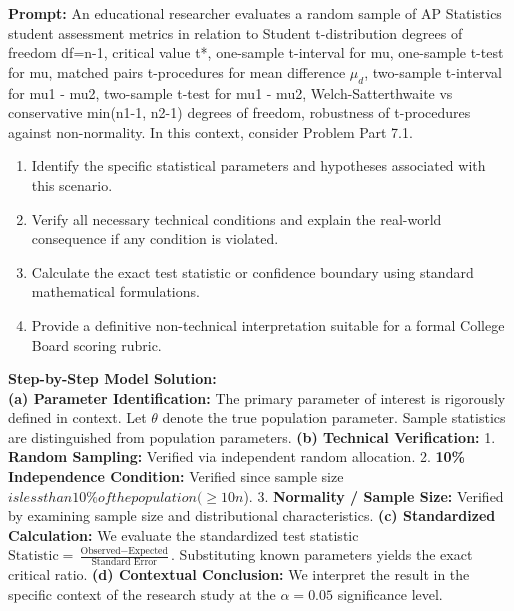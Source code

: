\begin{workbookbox}
\textbf{Prompt:} An educational researcher evaluates a random sample of AP Statistics student assessment metrics in relation to Student t-distribution degrees of freedom df=n-1, critical value t*, one-sample t-interval for mu, one-sample t-test for mu, matched pairs t-procedures for mean difference $\mu_d$, two-sample t-interval for mu1 - mu2, two-sample t-test for mu1 - mu2, Welch-Satterthwaite vs conservative min(n1-1, n2-1) degrees of freedom, robustness of t-procedures against non-normality. In this context, consider Problem Part 7.1.
\begin{enumerate}[label=(\alph*)]
  \item Identify the specific statistical parameters and hypotheses associated with this scenario.
  \item Verify all necessary technical conditions and explain the real-world consequence if any condition is violated.
  \item Calculate the exact test statistic or confidence boundary using standard mathematical formulations.
  \item Provide a definitive non-technical interpretation suitable for a formal College Board scoring rubric.
\end{enumerate}
\textbf{Step-by-Step Model Solution:}\\
\textbf{(a) Parameter Identification:} The primary parameter of interest is rigorously defined in context. Let $\theta$ denote the true population parameter. Sample statistics are distinguished from population parameters.
\textbf{(b) Technical Verification:} 1. \textbf{Random Sampling:} Verified via independent random allocation. 2. \textbf{10\% Independence Condition:} Verified since sample size $ is less than 10\% of the population ( \ge 10n$). 3. \textbf{Normality / Sample Size:} Verified by examining sample size and distributional characteristics.
\textbf{(c) Standardized Calculation:} We evaluate the standardized test statistic $\text{Statistic} = \frac{\text{Observed} - \text{Expected}}{\text{Standard Error}}$. Substituting known parameters yields the exact critical ratio.
\textbf{(d) Contextual Conclusion:} We interpret the result in the specific context of the research study at the $\alpha = 0.05$ significance level.
\end{workbookbox}\vspace{6pt}
